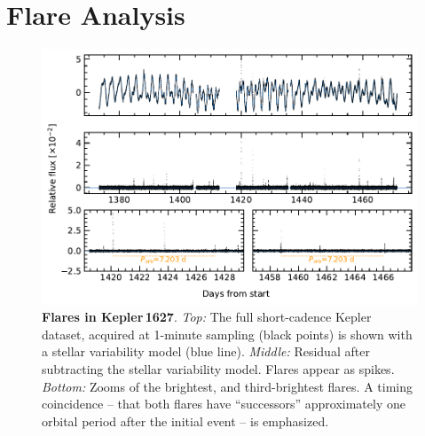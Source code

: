 \documentclass[12pt,modern,tighten]{aastex63}
\begin{document}
\section{Flare Analysis}
\label{app:flare}

\begin{figure}[t]
	\begin{center}
		\leavevmode
		\includegraphics[width=1\textwidth]{f7.pdf}
	\end{center}
	\vspace{-0.7cm}
	\caption{
		{\bf Flares in Kepler\,1627}.  
    {\it Top:}
    The full short-cadence Kepler dataset, acquired at 1-minute
    sampling (black points) is shown with a stellar variability model
    (blue line).
    {\it Middle:}
    Residual after subtracting the stellar variability model.  Flares
    appear as spikes.
    {\it Bottom:}
    Zooms of the brightest, and third-brightest flares.  A timing
    coincidence -- that both flares have ``successors'' approximately
    one orbital period after the initial event -- is emphasized.
		\label{fig:flarezoom}
	}
\end{figure}
\end{document}

